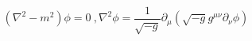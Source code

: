 \begin{equation}\label{eqgen}
(\nabla^2-m^2)\phi=0 \ ,
\nabla^2\phi=\frac{1}{\sqrt{-g}}
\partial_{\mu}(\sqrt{-g}
g^{\mu\nu}\partial_{\nu}\phi) \ 
\end{equation}

